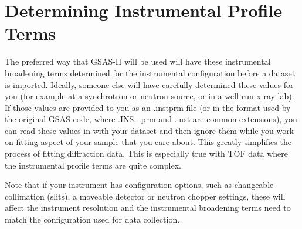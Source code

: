  

\section{Determining Instrumental Profile Terms}\label{ref:DeterminingInstrumental}

The preferred way that GSAS-II will be used will have these instrumental broadening terms determined for the instrumental configuration before a dataset is imported. Ideally, someone else will have carefully determined these values for you (for example at a synchrotron or neutron source, or in a well-run x-ray lab). If those values are provided to you as an .instprm file (or in the format used by the original GSAS code, where .INS, .prm and .inst are common extensions), you can read these values in with your dataset and then ignore them while you work on fitting aspect of your sample that you care about. This greatly simplifies the process of fitting diffraction data. This is especially true with TOF data where the instrumental profile terms are quite complex. 

Note that if your instrument has configuration options, such as changeable collimation (slits), a moveable detector or neutron chopper settings, these will affect the instrument resolution and the instrumental broadening terms need to match the configuration used for data collection. 

